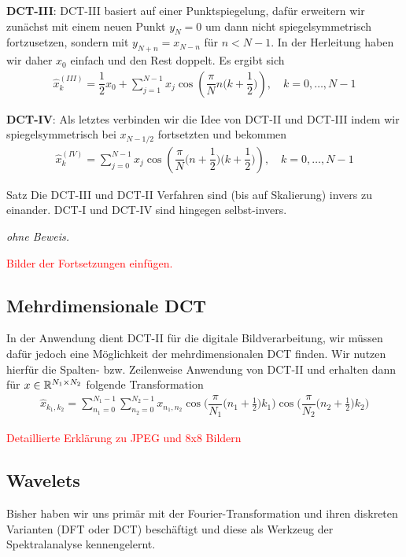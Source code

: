 \textbf{DCT-III}:
DCT-III basiert auf einer Punktspiegelung, dafür erweitern wir zunächst mit einem neuen Punkt $y_N=0$ um dann nicht 
spiegelsymmetrisch fortzusetzen, sondern mit $y_{N+n} = x_{N-n}$ für $n<N-1$. In der Herleitung haben wir daher 
$x_0$ einfach und den Rest doppelt. Es ergibt sich
%
\begin{align*}
  \hat{x}^{(III)}_k 
  = \dfrac{1}{2}x_0 + \sum_{j=1}^{N-1} x_j \cos\left(\dfrac{\pi}{N}n\Big(k+\dfrac{1}{2}\Big)\right), 
  \quad k=0,\dots,N-1
  \tag{III}\label{eq:DCTIIIeq}
\end{align*}
%

\textbf{DCT-IV}:
Als letztes verbinden wir die Idee von DCT-II und DCT-III indem wir spiegelsymmetrisch bei $x_{N-1/2}$ fortsetzten 
und bekommen
%
\begin{align*}
  \hat{x}^{(IV)}_k 
  = \sum_{j=0}^{N-1} x_j \cos\left(\dfrac{\pi}{N}\Big(n+\dfrac{1}{2}\Big)\Big(k+\dfrac{1}{2}\Big)\right), 
  \quad k=0,\dots,N-1
  \tag{IV}\label{eq:DCTIVeq}
\end{align*}
%

\begin{colbox}{Satz}
  Die DCT-III und DCT-II Verfahren sind (bis auf Skalierung) invers zu einander. DCT-I und DCT-IV sind hingegen 
  selbst-invers.
\end{colbox}
\textit{ohne Beweis.}

\textcolor{red}{Bilder der Fortsetzungen einfügen.}

\subsection{Mehrdimensionale DCT}
In der Anwendung dient DCT-II für die digitale Bildverarbeitung, wir müssen dafür jedoch eine Möglichkeit der 
mehrdimensionalen DCT finden. Wir nutzen hierfür die Spalten- bzw. Zeilenweise Anwendung von DCT-II und 
erhalten dann für $x\in\mathbb R^{N_1\times N_2}$ folgende Transformation
\begin{align*}
  \hat{x}_{k_1,k_2}
  = \sum_{n_1=0}^{N_1-1} \sum_{n_2=0}^{N_2-1}
  x_{n_1,n_2}
  \cos\Big(\dfrac{\pi}{N_1}\big(n_1+\tfrac{1}{2}\big)k_1\Big)
  \cos\Big(\dfrac{\pi}{N_2}\big(n_2+\tfrac{1}{2}\big)k_2\Big)
\end{align*}

\textcolor{red}{Detaillierte Erklärung zu JPEG und 8x8 Bildern}

\subsection{Wavelets}
Bisher haben wir uns primär mit der Fourier-Transformation und ihren diskreten Varianten (DFT oder DCT) beschäftigt 
und diese als Werkzeug der Spektralanalyse kennengelernt. 

